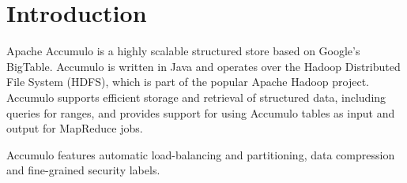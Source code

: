 
%
%

\chapter{Introduction}
Apache Accumulo is a highly scalable structured store based on Google's BigTable.
Accumulo is written in Java and operates over the Hadoop Distributed File System
(HDFS), which is part of the popular Apache Hadoop project. Accumulo supports
efficient storage and retrieval of structured data, including queries for ranges, and
provides support for using Accumulo tables as input and output for MapReduce
jobs.

Accumulo features automatic load-balancing and partitioning, data compression
and fine-grained security labels.

